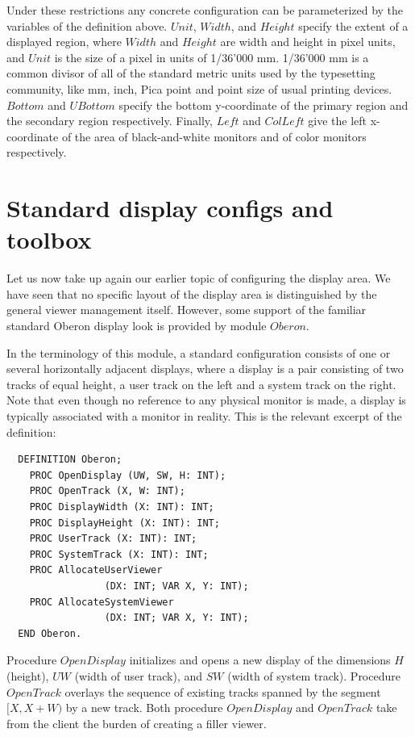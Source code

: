 Under these restrictions any concrete configuration can be parameterized by the variables of the
definition above. $Unit$, $Width$, and $Height$ specify the extent of a displayed region, where $Width$ and
$Height$ are width and height in pixel units, and $Unit$ is the size of a pixel in units of 1/36’000 mm.
1/36’000 mm is a common divisor of all of the standard metric units used by the typesetting
community, like mm, inch, Pica point and point size of usual printing devices. $Bottom$ and $UBottom$
specify the bottom y-coordinate of the primary region and the secondary region respectively.
Finally, $Left$ and $ColLeft$ give the left x-coordinate of the area of black-and-white monitors and of
color monitors respectively.

\section{Standard display configs and toolbox}
Let us now take up again our earlier topic of configuring the display area. We have seen that no
specific layout of the display area is distinguished by the general viewer management itself.
However, some support of the familiar standard Oberon display look is provided by module $Oberon$.

In the terminology of this module, a standard configuration consists of one or several horizontally
adjacent displays, where a display is a pair consisting of two tracks of equal height, a user track
on the left and a system track on the right. Note that even though no reference to any physical
monitor is made, a display is typically associated with a monitor in reality.
This is the relevant excerpt of the definition:
\begin{verbatim}
  DEFINITION Oberon;
    PROC OpenDisplay (UW, SW, H: INT);
    PROC OpenTrack (X, W: INT);
    PROC DisplayWidth (X: INT): INT;
    PROC DisplayHeight (X: INT): INT;
    PROC UserTrack (X: INT): INT;
    PROC SystemTrack (X: INT): INT;
    PROC AllocateUserViewer
                 (DX: INT; VAR X, Y: INT);
    PROC AllocateSystemViewer
                 (DX: INT; VAR X, Y: INT);
  END Oberon.
\end{verbatim}
Procedure $OpenDisplay$ initializes and opens a new display of the dimensions $H$ (height), $UW$
(width of user track), and $SW$ (width of system track). Procedure $OpenTrack$ overlays the
sequence of existing tracks spanned by the segment $[X, X + W)$ by a new track. Both procedure
$OpenDisplay$ and $OpenTrack$ take from the client the burden of creating a filler viewer.

